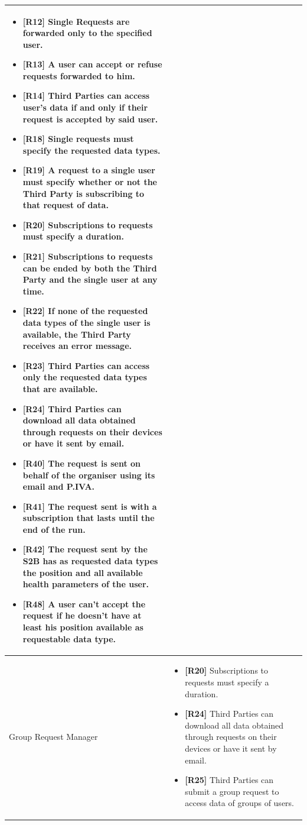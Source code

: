 \documentclass[titlepage]{article}
\begin{document}
\begin{longtable}{| p{5 cm} | p{8 cm} |}
\begin{itemize}
			\item {\bf [R12]} Single Requests are forwarded only to the specified user.
			\item {\bf [R13]} A user can accept or refuse requests forwarded to him. 
			\item {\bf [R14]} Third Parties can access user’s data if and only if their request is accepted by said user. 
			\item {\bf [R18]} Single requests must specify the requested data types. 
			\item {\bf [R19]} A request to a single user must specify whether or not the Third Party is subscribing to that request of data.
			\item {\bf [R20]} Subscriptions to requests must specify a duration.
			\item {\bf [R21]} Subscriptions to requests can be ended by both the Third Party and the single user at any time.
			\item {\bf [R22]} If none of the requested data types of the single user is available, the Third Party receives an error message.
			\item {\bf [R23]} Third Parties can access only the requested data types that are available.
			\item {\bf [R24]} Third Parties can download all data obtained through requests on their devices or have it sent by email.
			\item {\bf [R40]} The request is sent on behalf of the organiser using its email and P.IVA.
			\item {\bf [R41]} The request sent is with a subscription that lasts until the end of the run.
			\item {\bf [R42]} The request sent by the S2B has as requested data types the position and all available health parameters of the user.
			\item {\bf [R48]} A user can’t accept the request if he doesn’t have at least his position available as requestable data type.
		\end{itemize}		
		\\	 \hline	
		\newline Group Request Manager & 
		\begin{itemize}
			\item {\bf [R20]} Subscriptions to requests must specify a duration.
			\item {\bf [R24]} Third Parties can download all data obtained through requests on their devices or have it sent by email.
			\item {\bf [R25]} Third Parties can submit a group request to access data of groups of users. 

\end{itemize}
\end{longtable}
\end{document}
